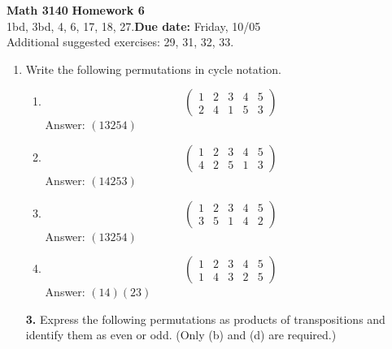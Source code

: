 \documentclass[12pt,reqno]{amsart}
\newcommand{\probskip}{\vskip1cm}
\begin{document}
\thispagestyle{empty}

\noindent \textbf{Math 3140} \hfill {\bf Homework 6}\\[4pt]
   1bd, 3bd, 4, 6, 17, 18, 27.\hfill {\bf Due date:} Friday, 10/05\\  
   Additional suggested exercises: 29, 31, 32, 33.  \\


\medskip


\begin{enumerate}[{\bf 1.}]

\item %
Write the following permutations in cycle notation.
\begin{multicols}{2}
\begin{enumerate}
 
\item
\[
\begin{pmatrix}
1 & 2 & 3 & 4 & 5 \\
2 & 4 & 1 & 5 & 3
\end{pmatrix}
\]
Answer: $(13254)$

\item
\[
\begin{pmatrix}
1 & 2 & 3 & 4 & 5 \\
4 & 2 & 5 & 1 & 3
\end{pmatrix}
\]
Answer: $(14253)$

\item
\[
\begin{pmatrix}
1 & 2 & 3 & 4 & 5 \\
3 & 5 & 1 & 4 & 2
\end{pmatrix}
\]
Answer: $(13254)$

\item
\[
\begin{pmatrix}
1 & 2 & 3 & 4 & 5 \\
1 & 4 & 3 & 2 & 5
\end{pmatrix}
\]
Answer: $(14)(23)$

\end{enumerate}
\end{multicols}

\probskip
 
\item[{\bf 3.}] 
Express the following permutations as products of transpositions and
identify them as even or odd.  (Only (b) and (d) are required.)
\begin{multicols}{2}
\begin{enumerate}
 

\end{enumerate}
\end{multicols}
\end{enumerate}
\end{document}
